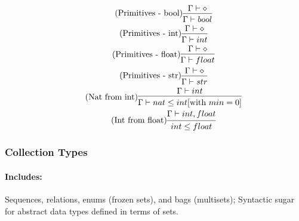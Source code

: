 \documentclass{article}
\begin{document}
\begin{gather}
\tag{Primitives - bool}
\begin{prooftree}
\hypo{\Gamma \vdash \diamond}
\infer1{\Gamma \vdash bool }
\end{prooftree}
\\
\tag{Primitives - int}
\begin{prooftree}
\hypo{\Gamma \vdash \diamond}
\infer1{\Gamma \vdash int }
\end{prooftree}
\\
\tag{Primitives - float}
\begin{prooftree}
\hypo{\Gamma \vdash \diamond}
\infer1{\Gamma \vdash float }
\end{prooftree}
\\
\tag{Primitives - str}
\begin{prooftree}
\hypo{\Gamma \vdash \diamond}
\infer1{\Gamma \vdash str }
\end{prooftree}
\\
\tag{Nat from int}
\begin{prooftree}
\hypo{\Gamma \vdash int}
\infer1{\Gamma \vdash nat \leq int[\text{with } min=0] }
\end{prooftree}
\\
\tag{Int from float}
\begin{prooftree}
\hypo{\Gamma \vdash int, float}
\infer1{int \leq float }
\end{prooftree}
\end{gather}

\subsubsection{Collection Types}
\paragraph{Includes:} Sequences, relations, enums (frozen sets), and bags (multisets); Syntactic sugar for abstract data types defined in terms of sets.
\end{document}
